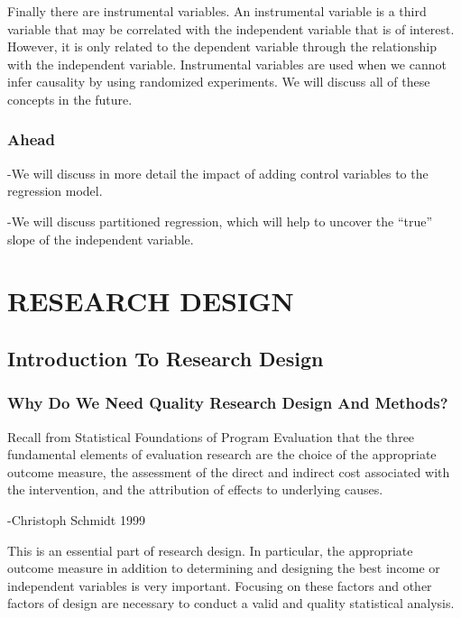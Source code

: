 \documentclass[]{book}
\theoremstyle{definition}
\theoremstyle{definition}
\theoremstyle{definition}
\theoremstyle{remark}
\begin{document}
Finally there are instrumental variables. An instrumental variable is a
third variable that may be correlated with the independent variable that
is of interest. However, it is only related to the dependent variable
through the relationship with the independent variable. Instrumental
variables are used when we cannot infer causality by using randomized
experiments. We will discuss all of these concepts in the future.

\hypertarget{ahead}{%
\section{Ahead}\label{ahead}}

-We will discuss in more detail the impact of adding control variables
to the regression model.

-We will discuss partitioned regression, which will help to uncover the
``true'' slope of the independent variable.

\hypertarget{part-research-design}{%
\part{RESEARCH DESIGN}\label{part-research-design}}

\hypertarget{introduction-to-research-design}{%
\chapter{Introduction To Research
Design}\label{introduction-to-research-design}}

\hypertarget{why-do-we-need-quality-research-design-and-methods}{%
\section{Why Do We Need Quality Research Design And
Methods?}\label{why-do-we-need-quality-research-design-and-methods}}

Recall from Statistical Foundations of Program Evaluation that the three
fundamental elements of evaluation research are the choice of the
appropriate outcome measure, the assessment of the direct and indirect
cost associated with the intervention, and the attribution of effects to
underlying causes.

-Christoph Schmidt 1999

This is an essential part of research design. In particular, the
appropriate outcome measure in addition to determining and designing the
best income or independent variables is very important. Focusing on
these factors and other factors of design are necessary to conduct a
valid and quality statistical analysis.
\end{document}

